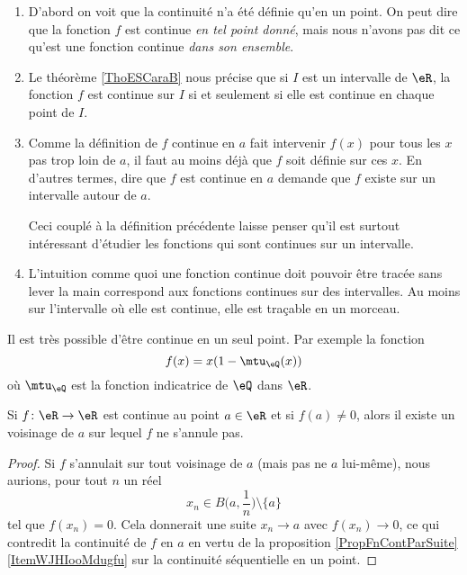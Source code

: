 \begin{enumerate}
\item D'abord on voit que la continuité n'a été définie qu'en un point. On peut dire que la fonction $f$ est continue \emph{en tel point donné}, mais nous n'avons pas dit ce qu'est une fonction continue \emph{dans son ensemble}.

\item
    Le théorème \ref{ThoESCaraB} nous précise que si $I$ est un intervalle de $\eR$, la fonction $f$ est continue sur $I$ si et seulement si elle est continue en chaque point de $I$.

\item Comme la définition de $f$ continue en $a$ fait intervenir $f(x)$ pour tous les $x$ pas trop loin de $a$, il faut au moins déjà que $f$ soit définie sur ces $x$. En d'autres termes, dire que $f$ est continue en $a$ demande que $f$ existe sur un intervalle autour de $a$.

Ceci couplé à la définition précédente laisse penser qu'il est surtout intéressant d'étudier les fonctions qui sont continues sur un intervalle.

\item L'intuition comme quoi une fonction continue doit pouvoir être tracée sans lever la main correspond aux fonctions continues sur des intervalles. Au moins sur l'intervalle où elle est continue, elle est traçable en un morceau.
\end{enumerate}

\begin{example}
    Il est très possible d'être continue en un seul point. Par exemple la fonction
    \begin{equation}
        f(x)=x(1-\mtu_{\eQ}(x))
    \end{equation}
    où \( \mtu_{\eQ}\) est la fonction indicatrice de \( \eQ\) dans \( \eR\).
\end{example}

\begin{proposition}     \label{PROPooUBUAooNIxjfg}
    Si \( f\colon \eR\to \eR\) est continue au point \( a\in \eR\) et si \( f(a)\neq 0\), alors il existe un voisinage de \( a\) sur lequel \( f\) ne s'annule pas.
\end{proposition}

\begin{proof}
    Si \( f \) s'annulait sur tout voisinage de \( a\) (mais pas ne \( a\) lui-même), nous aurions, pour tout \( n\) un réel
    \begin{equation}
        x_n\in B\big( a,\frac{1}{ n } \big)\setminus\{ a \}
    \end{equation}
    tel que \( f(x_n)=0\). Cela donnerait une suite \( x_n\to a\) avec \( f(x_n)\to 0\), ce qui contredit la continuité de \( f\) en \( a\) en vertu de la proposition \ref{PropFnContParSuite}\ref{ItemWJHIooMdugfu} sur la continuité séquentielle en un point.
\end{proof}

